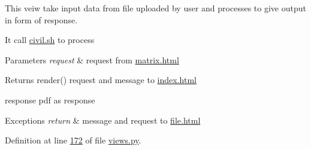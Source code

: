 This veiw take input data from file uploaded by user and processes to give output in form of response. 

It call \hyperlink{civil_8sh}{civil.\+sh} to process 
\begin{DoxyParams}{Parameters}
{\em request} & request from \hyperlink{matrix_8html}{matrix.\+html} \\
\hline
\end{DoxyParams}
\begin{DoxyReturn}{Returns}
render() request and message to \hyperlink{index_8html}{index.\+html} 

response pdf as response 
\end{DoxyReturn}

\begin{DoxyExceptions}{Exceptions}
{\em return} & message and request to \hyperlink{file_8html}{file.\+html} \\
\hline
\end{DoxyExceptions}


Definition at line \hyperlink{views_8py_source_l00172}{172} of file \hyperlink{views_8py_source}{views.\+py}.


